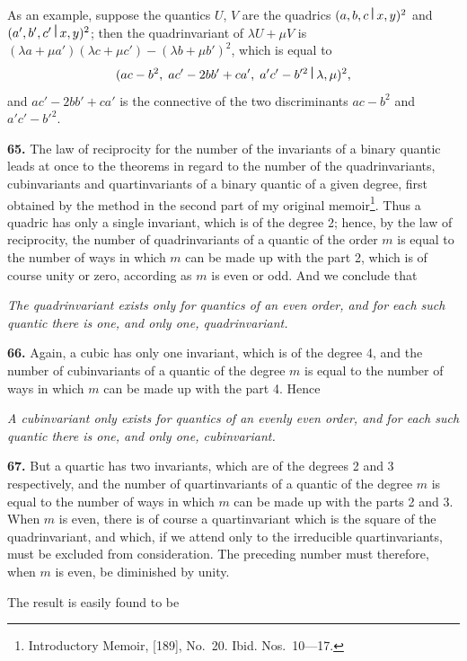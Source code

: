 \documentclass[12pt,a4paper]{article}
\theoremstyle{definition}
\begin{document}
As an example, suppose the quantics $U$, $V$ are the quadrics $(a,b,c\,\raisebox{0.5ex}{\textbf{\textbar}}\,x,y)^2$ and $(a',b',c'\,\raisebox{0.5ex}{\textbf{\textbar}}\,x,y)^2$; then the quadrinvariant of $\lambda U + \mu V$ is $(\lambda a + \mu a')(\lambda c + \mu c') - (\lambda b + \mu b')^2$, which is equal to
\[(ac-b^2,\; ac'-2bb'+ca',\; a'c'-b'^2\,\raisebox{0.5ex}{\textbf{\textbar}}\,\lambda,\mu)^2,\]
and $ac'-2bb'+ca'$ is the connective of the two discriminants $ac-b^2$ and $a'c'-b'^2$.

\newpage

\medskip
\noindent\textbf{65.} The law of reciprocity for the number of the invariants of a binary quantic leads at once to the theorems in regard to the number of the quadrinvariants, cubinvariants and quartinvariants of a binary quantic of a given degree, first obtained by the method in the second part of my original memoir\footnote{Introductory Memoir, [189], No.~20. Ibid. Nos.~10---17.}. Thus a quadric has only a single invariant, which is of the degree 2; hence, by the law of reciprocity, the number of quadrinvariants of a quantic of the order $m$ is equal to the number of ways in which $m$ can be made up with the part 2, which is of course unity or zero, according as $m$ is even or odd. And we conclude that

\textit{The quadrinvariant exists only for quantics of an even order, and for each such quantic there is one, and only one, quadrinvariant.}

\medskip
\noindent\textbf{66.} Again, a cubic has only one invariant, which is of the degree 4, and the number of cubinvariants of a quantic of the degree $m$ is equal to the number of ways in which $m$ can be made up with the part 4. Hence

\textit{A cubinvariant only exists for quantics of an evenly even order, and for each such quantic there is one, and only one, cubinvariant.}

\medskip
\noindent\textbf{67.} But a quartic has two invariants, which are of the degrees 2 and 3 respectively, and the number of quartinvariants of a quantic of the degree $m$ is equal to the number of ways in which $m$ can be made up with the parts 2 and 3. When $m$ is even, there is of course a quartinvariant which is the square of the quadrinvariant, and which, if we attend only to the irreducible quartinvariants, must be excluded from consideration. The preceding number must therefore, when $m$ is even, be diminished by unity.

The result is easily found to be
\end{document}
